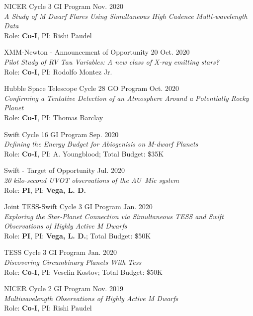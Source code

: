 \documentclass[letter,12pt]{article}
\begin{document}
\begin{etaremune}
\item NICER Cycle 3 GI Program \hfill Nov. 2020 \\
\textit{A Study of M Dwarf Flares Using Simultaneous High Cadence Multi-wavelength Data} \\ Role: \textbf{Co-I}, PI: Rishi Paudel

\item XMM-Newton - Announcement of Opportunity 20 \hfill Oct. 2020 \\
\textit{Pilot Study of RV Tau Variables: A new class of X-ray emitting stars?} \\ Role: \textbf{Co-I}, PI: Rodolfo Montez Jr.

\item Hubble Space Telescope Cycle 28 GO Program \hfill Oct. 2020 \\
\textit{Confirming a Tentative Detection of an Atmosphere Around a Potentially Rocky Planet} \\ Role: \textbf{Co-I}, PI: Thomas Barclay

\item Swift Cycle 16 GI Program  \hfill Sep. 2020 \\
\textit{Defining the Energy Budget for Abiogenisis on M-dwarf Planets} \\ Role: \textbf{Co-I}, PI: A. Youngblood; Total Budget: \$35K

\item Swift - Target of Opportunity \hfill Jul. 2020 \\
\textit{20 kilo-second UVOT observations of the AU~Mic system} \\ Role: \textbf{PI}, PI: \textbf{Vega, L. D.}

\item Joint TESS-Swift Cycle 3 GI Program  \hfill Jan. 2020 \\
\textit{Exploring the Star-Planet Connection via Simultaneous TESS and Swift Observations of Highly Active M Dwarfs} \\ Role: \textbf{PI}, PI: \textbf{Vega, L. D.}; Total Budget: \$50K 

\item TESS Cycle 3 GI Program  \hfill Jan. 2020 \\
\textit{Discovering Circumbinary Planets With Tess} \\ Role: \textbf{Co-I}, PI: Veselin Kostov; Total Budget: \$50K

\item NICER Cycle 2 GI Program \hfill Nov. 2019 \\
\textit{Multiwavelength Observations of Highly Active M Dwarfs} \\ Role: \textbf{Co-I}, PI: Rishi Paudel


\end{etaremune}
\end{document}
